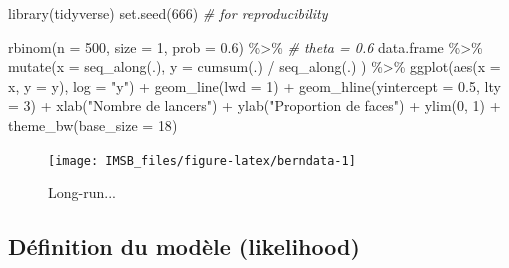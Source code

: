 \documentclass[
  a4paper,11pt,twoside,onecolumn,openright,final,oldfontcommands]{memoir}
\newenvironment{Shaded}{\begin{snugshade}}{\end{snugshade}}
\newcommand{\AttributeTok}[1]{\textcolor[rgb]{0.77,0.63,0.00}{#1}}
\newcommand{\CommentTok}[1]{\textcolor[rgb]{0.56,0.35,0.01}{\textit{#1}}}
\newcommand{\DecValTok}[1]{\textcolor[rgb]{0.00,0.00,0.81}{#1}}
\newcommand{\FloatTok}[1]{\textcolor[rgb]{0.00,0.00,0.81}{#1}}
\newcommand{\FunctionTok}[1]{\textcolor[rgb]{0.00,0.00,0.00}{#1}}
\newcommand{\NormalTok}[1]{#1}
\newcommand{\SpecialCharTok}[1]{\textcolor[rgb]{0.00,0.00,0.00}{#1}}
\newcommand{\StringTok}[1]{\textcolor[rgb]{0.31,0.60,0.02}{#1}}
\theoremstyle{definition}
\theoremstyle{definition}
\theoremstyle{definition}
\theoremstyle{definition}
\theoremstyle{remark}
\begin{document}
\begin{Shaded}
\begin{Highlighting}[]
\FunctionTok{library}\NormalTok{(tidyverse)}
\FunctionTok{set.seed}\NormalTok{(}\DecValTok{666}\NormalTok{) }\CommentTok{\# for reproducibility}

\FunctionTok{rbinom}\NormalTok{(}\AttributeTok{n =} \DecValTok{500}\NormalTok{, }\AttributeTok{size =} \DecValTok{1}\NormalTok{, }\AttributeTok{prob =} \FloatTok{0.6}\NormalTok{) }\SpecialCharTok{\%\textgreater{}\%} \CommentTok{\# theta = 0.6}
\NormalTok{        data.frame }\SpecialCharTok{\%\textgreater{}\%}
        \FunctionTok{mutate}\NormalTok{(}\AttributeTok{x =} \FunctionTok{seq\_along}\NormalTok{(.), }\AttributeTok{y =} \FunctionTok{cumsum}\NormalTok{(.) }\SpecialCharTok{/} \FunctionTok{seq\_along}\NormalTok{(.) ) }\SpecialCharTok{\%\textgreater{}\%}
        \FunctionTok{ggplot}\NormalTok{(}\FunctionTok{aes}\NormalTok{(}\AttributeTok{x =}\NormalTok{ x, }\AttributeTok{y =}\NormalTok{ y), }\AttributeTok{log =} \StringTok{"y"}\NormalTok{) }\SpecialCharTok{+}
        \FunctionTok{geom\_line}\NormalTok{(}\AttributeTok{lwd =} \DecValTok{1}\NormalTok{) }\SpecialCharTok{+}
        \FunctionTok{geom\_hline}\NormalTok{(}\AttributeTok{yintercept =} \FloatTok{0.5}\NormalTok{, }\AttributeTok{lty =} \DecValTok{3}\NormalTok{) }\SpecialCharTok{+}
        \FunctionTok{xlab}\NormalTok{(}\StringTok{"Nombre de lancers"}\NormalTok{) }\SpecialCharTok{+}
        \FunctionTok{ylab}\NormalTok{(}\StringTok{"Proportion de faces"}\NormalTok{) }\SpecialCharTok{+}
        \FunctionTok{ylim}\NormalTok{(}\DecValTok{0}\NormalTok{, }\DecValTok{1}\NormalTok{) }\SpecialCharTok{+}
        \FunctionTok{theme\_bw}\NormalTok{(}\AttributeTok{base\_size =} \DecValTok{18}\NormalTok{)}
\end{Highlighting}
\end{Shaded}

\begin{figure}[!htb]

{\centering \texttt{[image: IMSB\_files/figure-latex/berndata-1]} 

}

\caption{Long-run...}\label{fig:berndata}
\end{figure}

\hypertarget{duxe9finition-du-moduxe8le-likelihood}{%
\subsection{Définition du modèle (likelihood)}\label{duxe9finition-du-moduxe8le-likelihood}}
\end{document}
